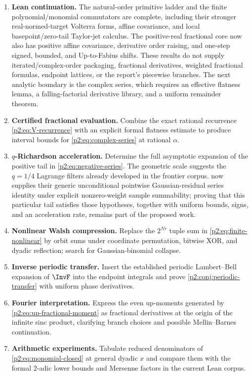 \documentclass[11pt,oneside]{article}
\theoremstyle{definition}
\theoremstyle{remark}
\newcommand{\1}{\mathbf 1}
\begin{document}
\begin{enumerate}
\item \textbf{Lean continuation.}  The natural-order primitive ladder and the
finite polynomial/monomial commutators are complete, including their stronger
real-normed-target Volterra forms, affine covariance, and local
basepoint/zero-tail Taylor-jet calculus.  The positive-real fractional core now also has
positive affine covariance, derivative order raising, and one-step signed, bounded, and
Up-to-Fabius shifts.  These results do not supply iterated/complex-order packaging,
fractional derivatives, weighted fractional formulas, endpoint lattices, or the report's
piecewise branches.  The next analytic
boundary is the complex series, which
requires an effective flatness lemma, a falling-factorial derivative library,
and a uniform remainder theorem.
\item \textbf{Certified fractional evaluation.}  Combine the exact rational recurrence \eqref{p2:eq:V-recurrence} with an
explicit formal flatness estimate to produce interval bounds for
\eqref{p2:eq:complex-series} at rational $\alpha$.
\item \textbf{$q$-Richardson acceleration.}  Determine the full asymptotic
expansion of the positive tail in \eqref{p2:eq:negative-series}.  The geometric
scale suggests the $q=1/4$ Lagrange filters already developed in the frontier
corpus.   now supplies their generic
unconditional pointwise Gaussian-residual series identity under explicit
nonzero-weight sample summability; proving that this particular tail satisfies those
hypotheses, together with uniform bounds, signs, and an acceleration rate, remains part of
the proposed work.
\item \textbf{Nonlinear Walsh compression.}  Replace the $2^{Nr}$ tuple sum in
\eqref{p2:eq:finite-nonlinear} by orbit sums under coordinate permutation,
bitwise XOR, and dyadic reflection; search for Gaussian-binomial collapse.
\item \textbf{Inverse periodic transfer.}  Insert the established periodic
Lambert--Bell expansion of $\InvF$ into the endpoint integrals and prove
\cref{p2:conj:periodic-transfer} with uniform phase derivatives.
\item \textbf{Fourier interpretation.}  Express the even up-moments generated
by \eqref{p2:eq:up-fractional-moment} as fractional derivatives at the origin of
the infinite sinc product, clarifying branch choices and possible Mellin--Barnes
continuation.
\item \textbf{Arithmetic experiments.}  Tabulate reduced denominators of
\eqref{p2:eq:monomial-closed} at general dyadic $x$ and compare them with the
formal $2$-adic lower bounds and Mersenne factors in the current Lean corpus.
\end{enumerate}
\end{document}
